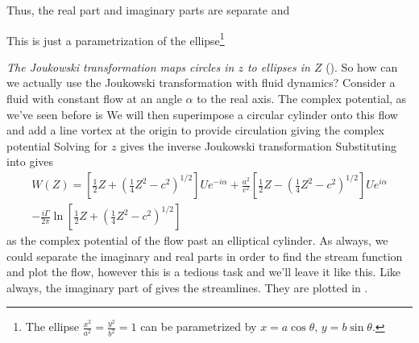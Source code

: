 \documentclass[12pt]{book}
\renewcommand{\and}{{\xspace \mathrm{and}\xspace}}
\begin{document}
Thus, the real part and imaginary parts are separate and
\unnumeq{X = \left(a + \frac{c^2}{a}\right)\cos\theta \qquad\and\qquad Y = \left(a-\frac{c^2}{a}\right)\sin\theta.}

This is just a parametrization of the ellipse\footnote{The ellipse $\frac{x^2}{a^2} = \frac{y^2}{b^2} = 1$ can be parametrized by $x=a\cos\theta$, $y=b\sin\theta$.   } 

 \textit{The Joukowski transformation maps circles in $z$ to ellipses in $Z$} (). So how can we actually use the Joukowski transformation with fluid dynamics?  Consider a fluid with constant flow at an angle $\alpha$ to the real axis.  The complex potential, as we've seen before is 
We will then superimpose a circular cylinder onto this flow and add a line vortex at the origin to provide circulation giving the complex potential
 Solving  for $z$ gives the inverse Joukowski transformation 
Substituting  into  gives
\begin{equation}
\begin{split}
W(Z) = \left[\tfrac{1}{2}Z + \left(\tfrac{1}{4}Z^2 - c^2\right)^{1/2}\right]Ue^{-i\alpha} + \frac{a^2}{c^2}\left[\tfrac{1}{2}Z - \left(\tfrac{1}{4}Z^2 - c^2\right)^{1/2}\right]Ue^{i\alpha}\\ - \frac{i\Gamma}{2\pi}\ln\left[\tfrac{1}{2}Z + \left(\tfrac{1}{4}Z^2 - c^2\right)^{1/2}\right]
\end{split}
\label{biiiigjowkowskicylinderellipse}
\end{equation}
as the complex potential of the flow past an elliptical cylinder.  As always, we could separate the imaginary and real parts in order to find the stream function and plot the flow, however this is a tedious task and we'll leave it like this.  Like always, the imaginary part of  gives the streamlines.  They are plotted in .
\end{document}
